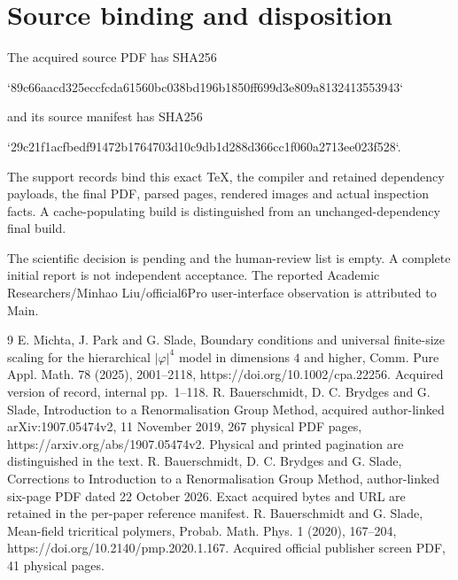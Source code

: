 \documentclass[10pt]{article}
\begin{document}
\section*{Source binding and disposition}
The acquired source PDF has SHA256\par
`89c66aacd325eccfcda61560bc038bd196b1850ff699d3e809a8132413553943`\par
and its source manifest has SHA256\par
`29c21f1acfbedf91472b1764703d10c9db1d288d366cc1f060a2713ee023f528`.\par
The support records bind this exact TeX, the compiler and retained dependency payloads, the final PDF, parsed pages, rendered images and actual inspection facts. A cache-populating build is distinguished from an unchanged-dependency final build.\par
The scientific decision is pending and the human-review list is empty. A complete initial report is not independent acceptance. The reported Academic Researchers/Minhao Liu/official6Pro user-interface observation is attributed to Main.\par
9 E. Michta, J. Park and G. Slade, Boundary conditions and universal finite-size scaling for the hierarchical \(|\varphi|^4\) model in dimensions \(4\) and higher, Comm. Pure Appl. Math. 78 (2025), 2001–2118, https://doi.org/10.1002/cpa.22256. Acquired version of record, internal pp. 1–118. R. Bauerschmidt, D. C. Brydges and G. Slade, Introduction to a Renormalisation Group Method, acquired author-linked arXiv:1907.05474v2, 11 November 2019, 267 physical PDF pages, https://arxiv.org/abs/1907.05474v2. Physical and printed pagination are distinguished in the text. R. Bauerschmidt, D. C. Brydges and G. Slade, Corrections to Introduction to a Renormalisation Group Method, author-linked six-page PDF dated 22 October 2026. Exact acquired bytes and URL are retained in the per-paper reference manifest. R. Bauerschmidt and G. Slade, Mean-field tricritical polymers, Probab. Math. Phys. 1 (2020), 167–204, https://doi.org/10.2140/pmp.2020.1.167. Acquired official publisher screen PDF, 41 physical pages.\par
\end{document}
